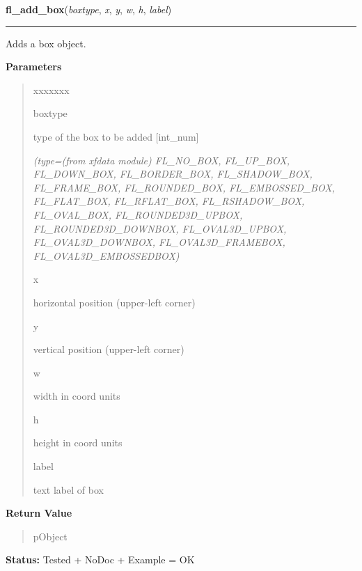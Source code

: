 \hspace{.8\funcindent}\begin{boxedminipage}{\funcwidth}

    \raggedright \textbf{fl\_add\_box}(\textit{boxtype}, \textit{x}, \textit{y}, \textit{w}, \textit{h}, \textit{label})

    \vspace{-1.5ex}

    \rule{\textwidth}{0.5\fboxrule}
\setlength{\parskip}{2ex}
    Adds a box object.

\setlength{\parskip}{1ex}
      \textbf{Parameters}
      \vspace{-1ex}

      \begin{quote}
        \begin{Ventry}{xxxxxxx}

          \item[boxtype]

          type of the box to be added [int\_num]

            {\it (type=(from xfdata module) FL\_NO\_BOX, FL\_UP\_BOX, FL\_DOWN\_BOX, 
FL\_BORDER\_BOX, FL\_SHADOW\_BOX, FL\_FRAME\_BOX, FL\_ROUNDED\_BOX, 
FL\_EMBOSSED\_BOX, FL\_FLAT\_BOX, FL\_RFLAT\_BOX, FL\_RSHADOW\_BOX, 
FL\_OVAL\_BOX, FL\_ROUNDED3D\_UPBOX, FL\_ROUNDED3D\_DOWNBOX, 
FL\_OVAL3D\_UPBOX, FL\_OVAL3D\_DOWNBOX, FL\_OVAL3D\_FRAMEBOX, 
FL\_OVAL3D\_EMBOSSEDBOX)}

          \item[x]

          horizontal position (upper-left corner)

          \item[y]

          vertical position (upper-left corner)

          \item[w]

          width in coord units

          \item[h]

          height in coord units

          \item[label]

          text label of box

        \end{Ventry}

      \end{quote}

      \textbf{Return Value}
    \vspace{-1ex}

      \begin{quote}
      pObject

      \end{quote}

\textbf{Status:} Tested + NoDoc + Example = OK



    \end{boxedminipage}

